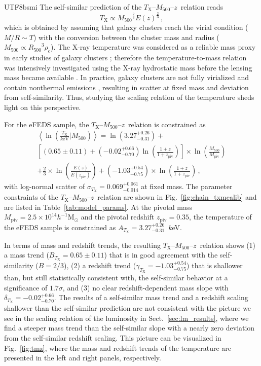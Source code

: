 \documentclass[longauth]{aa}
\newcommand{\Msunh}{\ensuremath{h^{-1}\mathrm{M}_{\odot}}}
\newcommand{\Rfiveoo}{\ensuremath{R_{500}}}
\newcommand{\Mfiveoo}{\ensuremath{M_{500}}}
\newcommand{\redshift}{\ensuremath{z}}
\newcommand{\rhocrit}{\ensuremath{\rho_{\mathrm{c}}}}
\newcommand{\MPIV}{\ensuremath{M_{\mathrm{piv}}}}
\newcommand{\ZPIV}{\ensuremath{z_{\mathrm{piv}}}}
\newcommand{\Ez}{\ensuremath{E(z)}}
\newcommand{\Ezpiv}{\ensuremath{E(z_{\mathrm{piv}})}}
\newcommand{\Tx}{\ensuremath{T_{\mathrm{X}}}}
\newcommand{\At}{\ensuremath{A_{T_{\mathrm{X}}}}}
\newcommand{\Bt}{\ensuremath{B_{T_{\mathrm{X}}}}}
\newcommand{\deltat}{\ensuremath{\delta_{T_{\mathrm{X}}}}}
\newcommand{\gammat}{\ensuremath{\gamma_{T_{\mathrm{X}}}}}
\newcommand{\sigmat}{\ensuremath{\sigma_{T_{\mathrm{X}}}}}
\newcommand{\ansAt}{\ensuremath{ 3.27^{+0.26}_{-0.31} }}
\newcommand{\ansBt}{\ensuremath{ 0.65\pm 0.11 }}
\newcommand{\ansdeltat}{\ensuremath{ -0.02^{+0.66}_{-0.70} }}
\newcommand{\ansgammat}{\ensuremath{ -1.03^{+0.54}_{-0.75} }}
\newcommand{\anssigmat}{\ensuremath{ 0.069^{+0.061}_{-0.014} }}
\begin{document}
\begin{CJK*}{UTF8}{bsmi}
The self-similar prediction of the \Tx--\Mfiveoo--\redshift\ relation reads
\[
\Tx \propto {\Mfiveoo}^{\frac{2}{3}} E(\redshift)^{\frac{2}{3}} \, ,
\]
which is obtained by assuming that galaxy clusters reach the virial condition ($M / R \sim T$) with the conversion between the cluster mass and radius ($\Mfiveoo \propto {\Rfiveoo}^3 \rhocrit$).
The X-ray temperature was considered as a reliable mass proxy in early studies of galaxy clusters \citep{smith79,mohr97,mohr99,ikebe02}; therefore the temperature-to-mass relation was intensively investigated using the X-ray hydrostatic mass \citep[e.g.,][]{finoguenov01,vikhlinin06} before the lensing mass became available \citep[e.g.,][]{lieu16}.
In practice, galaxy clusters are not fully virialized and contain nonthermal emissions \citep{ohara06}, resulting in scatter at fixed mass and deviation from self-similarity.
Thus, studying the scaling relation of the temperature sheds light on this perspective.


For the eFEDS sample, the \Tx--\Mfiveoo--\redshift\ relation is constrained as
%
\begin{multline}
\label{eq:tm}
\left\langle\ln\left( \frac{ \Tx }{ k\mathrm{eV}  } \Bigg|\Mfiveoo \right) \right\rangle 
= \ln \left(\ansAt \right) + \\
\left[ \left( \ansBt \right) + \left( \ansdeltat \right) \ln\left(\frac{1 + \redshift}{1 + \ZPIV}\right) \right] \times
\ln\left(\frac{\Mfiveoo}{\MPIV}\right) \\
 +\frac{2}{3} \times \ln\left(\frac{\Ez}{\Ezpiv}\right) + 
\left( \ansgammat \right)
 \times \ln \left(\frac{1 + \redshift}{1 + \ZPIV}\right)
 \, ,
\end{multline}
%
with log-normal scatter of $\sigmat = \anssigmat$ at fixed mass.
The parameter constraints of the \Tx--\Mfiveoo--\redshift\ relation are shown in Fig.~\ref{fig:chain_txmcalib} and are listed in Table~\ref{tab:model_params}.
At the pivotal mass $\MPIV = 2.5\times10^{14}\Msunh$ and the pivotal redshift $\ZPIV = 0.35$, the temperature of the eFEDS sample is constrained as $\At = \ansAt$~$k$eV.


In terms of mass and redshift trends, the resulting \Tx--\Mfiveoo--\redshift\ relation shows (1) a mass trend ($\Bt = \ansBt$) that is in good agreement with the self-similarity ($B = 2/3$), (2) a redshift trend ($\gammat = \ansgammat$) that is shallower than, but still statistically consistent with, the self-similar behavior at a significance of $1.7\sigma$, and (3) no clear redshift-dependent mass slope with $\deltat = \ansdeltat$.
The  results of a self-similar mass trend and a redshift scaling shallower than the self-similar prediction are not consistent
with the picture we see in the scaling relation of the luminosity in Sect.~\ref{sec:lm_results}, where we find a steeper mass trend than the self-similar slope with a nearly zero deviation from the self-similar redshift scaling.
This picture can be visualized in Fig.~\ref{fig:tmz}, where the mass and redshift trends of the temperature are presented in the left and right panels, respectively.


\end{CJK*}
\end{document}
